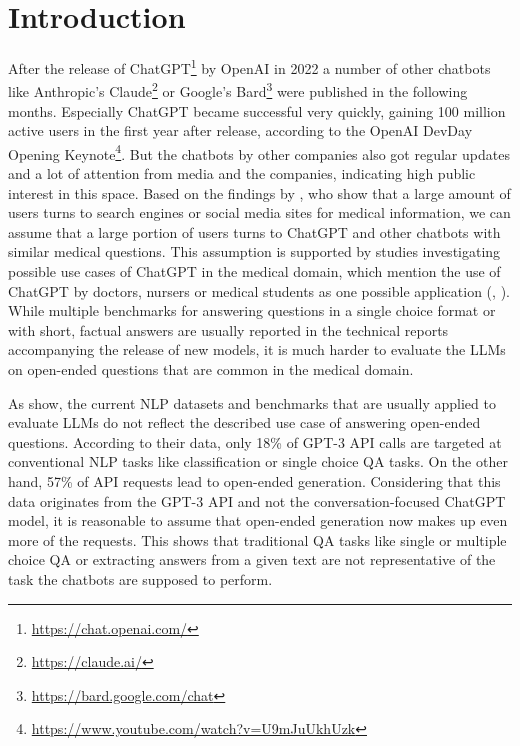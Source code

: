 \chapter{Introduction}\label{structure}
After the release of ChatGPT\footnote{\url{https://chat.openai.com/}} by OpenAI in 2022 a number of other chatbots like Anthropic's Claude\footnote{\url{https://claude.ai/}} or Google's Bard\footnote{\url{https://bard.google.com/chat}} were published in the following months.
Especially ChatGPT became successful very quickly, gaining 100 million active users in the first year after release, according to the OpenAI DevDay Opening Keynote\footnote{\url{https://www.youtube.com/watch?v=U9mJuUkhUzk}}.
But the chatbots by other companies also got regular updates and a lot of attention from media and the companies, indicating high public interest in this space.
Based on the findings by \cite{de:2014:seeking}, who show that a large amount of users turns to search engines or social media sites for medical information, we can assume that a large portion of users turns to ChatGPT and other chatbots with similar medical questions.
This assumption is supported by studies investigating possible use cases of ChatGPT in the medical domain, which mention the use of ChatGPT by doctors, nursers or medical students as one possible application (\cite{dave:2023:chatgpt}, \cite{khan:2023:chatgpt}).
While multiple benchmarks for answering questions in a single choice format or with short, factual answers are usually reported in the technical reports accompanying the release of new models, it is much harder to evaluate the LLMs on open-ended questions that are common in the medical domain.

As \cite{ouyang:2022:Training} show, the current NLP datasets and benchmarks that are usually applied to evaluate LLMs do not reflect the described use case of answering open-ended questions.
According to their data, only 18\% of GPT-3 API calls are targeted at conventional NLP tasks like classification or single choice QA tasks.
On the other hand, 57\% of API requests lead to open-ended generation.
Considering that this data originates from the GPT-3 API and not the conversation-focused ChatGPT model, it is reasonable to assume that open-ended generation now makes up even more of the requests.
This shows that traditional QA tasks like single or multiple choice QA or extracting answers from a given text are not representative of the task the chatbots are supposed to perform.

